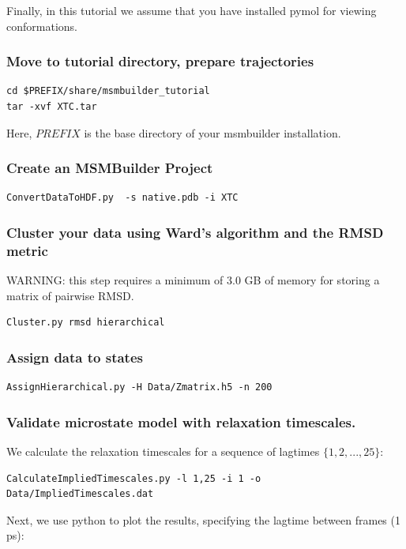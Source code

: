 \documentclass[12pt]{article}
\begin{document}
Finally, in this tutorial we assume that you have installed pymol for viewing conformations.

\subsubsection{Move to tutorial directory, prepare trajectories}
\begin{verbatim}
cd $PREFIX/share/msmbuilder_tutorial 
tar -xvf XTC.tar
\end{verbatim}

Here, $PREFIX$ is the base directory of your msmbuilder installation.

\subsubsection{Create an MSMBuilder Project}
\begin{verbatim}
ConvertDataToHDF.py  -s native.pdb -i XTC
\end{verbatim}

\subsubsection{Cluster your data using Ward's algorithm and the RMSD metric}
WARNING: this step requires a minimum of 3.0 GB of memory for storing a matrix of pairwise RMSD.
\begin{verbatim}
Cluster.py rmsd hierarchical
\end{verbatim}

\subsubsection{Assign data to states}

\begin{verbatim}
AssignHierarchical.py -H Data/Zmatrix.h5 -n 200
\end{verbatim}

\subsubsection{Validate microstate model with relaxation timescales.}
We calculate the relaxation timescales for a sequence of lagtimes $\{1, 2, ..., 25\}$:
\begin{verbatim}
CalculateImpliedTimescales.py -l 1,25 -i 1 -o Data/ImpliedTimescales.dat
\end{verbatim}

Next, we use python to plot the results, specifying the lagtime between frames (1 ps):  
\end{document}
